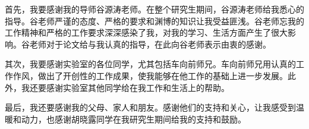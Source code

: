 \begin{acknowledgement}

首先，我要感谢我的导师谷源涛老师。在整个研究生期间，谷源涛老师给我悉心的指导。谷老师严谨的态度、严格的要求和渊博的知识让我受益匪浅。谷老师忘我的工作精神和严格的工作要求深深感染了我，对我的学习、生活方面产生了很大影响。谷老师对于论文给与我认真的指导，在此向谷老师表示由衷的感谢。

其次，我要感谢实验室的各位同学，尤其包括车向前师兄。车向前师兄用认真的工作作风，做出了开创性的工作成果，使我能够在他工作的基础上进一步发展。此外，我还要感谢实验室其他同学给在我工作和生活上的帮助。

最后，我还要感谢我的父母、家人和朋友。感谢他们的支持和关心，让我感受到温暖和动力，也感谢胡晓露同学在我研究生期间给我的支持和鼓励。

\end{acknowledgement}
